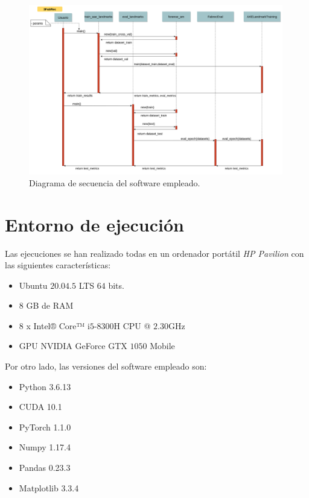 \begin{figure}[!h]
    \centering
    \includegraphics[width=0.99\textwidth]{img/Diagrama_secuencia.png}
    \caption{Diagrama de secuencia del software empleado.}
    \label{fig:Diagrama_secuencia}
\end{figure}

\newpage


\section{Entorno de ejecución}
\noindent Las ejecuciones se han realizado todas en un ordenador portátil \textit{HP Pavilion} con las siguientes características: 

\begin{itemize}
    \item Ubuntu $20.04.5$ LTS $64$ bits.
    \item $8$ GB de RAM
    \item $8$ x Intel® Core™ i$5$-$8300$H CPU @ $2.30$GHz
    \item GPU NVIDIA GeForce GTX $1050$ Mobile
\end{itemize}

\medskip

\noindent Por otro lado, las versiones del software empleado son: 

\begin{itemize}
    \item Python 3.6.13
    \item CUDA 10.1
    \item PyTorch 1.1.0
    \item Numpy 1.17.4
    \item Pandas 0.23.3
    \item Matplotlib 3.3.4
\end{itemize}


\endinput

